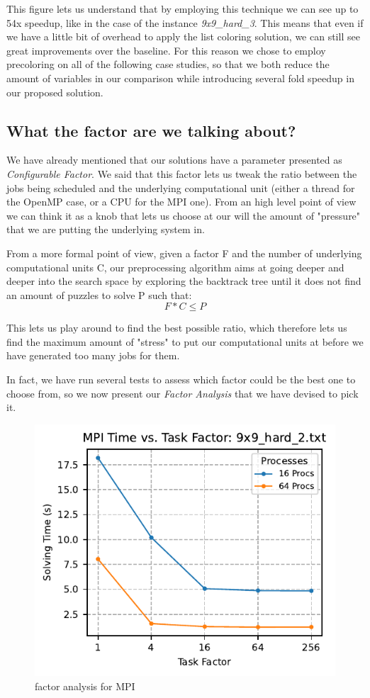 This figure lets us understand that by employing this technique we can see up to 54x speedup, like in the case of the instance \textit{9x9\_hard\_3}. This means that even if we have a little bit of overhead to apply the list coloring solution, we can still see great improvements over the baseline. For this reason we chose to employ precoloring on all of the following case studies, so that we both reduce the amount of variables in our comparison while introducing several fold speedup in our proposed solution.

\subsection{What the factor are we talking about?}
\label{subsec:factor}
We have already mentioned that our solutions have a parameter presented as \textit{Configurable Factor}. We said that this factor lets us tweak the ratio between the jobs being scheduled and the underlying computational unit (either a thread for the OpenMP case, or a CPU for the MPI one). From an high level point of view we can think it as a knob that lets us choose at our will the amount of "pressure" that we are putting the underlying system in.

From a more formal point of view, given a factor F and the number of underlying computational units C, our preprocessing algorithm aims at going deeper and deeper into the search space by exploring the backtrack tree until it does not find an amount of puzzles to solve P such that:
\[
    F * C \leq P
\]

This lets us play around to find the best possible ratio, which therefore lets us find the maximum amount of "stress" to put our computational units at before we have generated too many jobs for them.

In fact, we have run several tests to assess which factor could be the best one to choose from, so we now present our \textit{Factor Analysis} that we have devised to pick it.


\begin{figure}[htbp]
\centering
\includegraphics[width=0.9\linewidth]{imgs/factor_mpi_9x9_hard_2.pdf}
\caption{factor analysis for MPI}
\label{fig:factor_analysis_mpi}
\end{figure}

